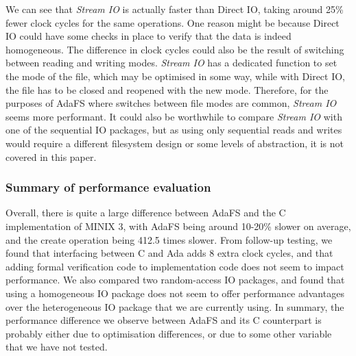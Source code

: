 We can see that \textit{Stream IO} is actually faster than Direct IO, taking around 25\% fewer clock cycles for the same operations.
One reason might be because Direct IO could have some checks in place to verify that the data is indeed homogeneous.
The difference in clock cycles could also be the result of switching between reading and writing modes.
\textit{Stream IO} has a dedicated function to set the mode of the file, which may be optimised in some way, while with Direct IO, the file has to be closed and reopened with the new mode.
Therefore, for the purposes of AdaFS where switches between file modes are common, \textit{Stream IO} seems more performant.
It could also be worthwhile to compare \textit{Stream IO} with one of the sequential IO packages, but as using only sequential reads and writes would require a different filesystem design or some levels of abstraction, it is not covered in this paper.

\subsubsection{Summary of performance evaluation}
Overall, there is quite a large difference between AdaFS and the C implementation of MINIX 3, with AdaFS being around 10-20\% slower on average, and the create operation being 412.5 times slower.
From follow-up testing, we found that interfacing between C and Ada adds 8 extra clock cycles, and that adding formal verification code to implementation code does not seem to impact performance.
We also compared two random-access IO packages, and found that using a homogeneous IO package does not seem to offer performance advantages over the heterogeneous IO package that we are currently using.
In summary, the performance difference we observe between AdaFS and its C counterpart is probably either due to optimisation differences, or due to some other variable that we have not tested.
